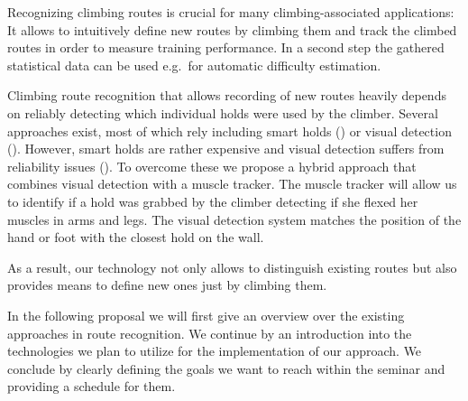 Recognizing climbing routes is crucial for many climbing-associated applications:
It allows to intuitively define new routes by climbing them and track the climbed routes in order to measure training performance.
In a second step the gathered statistical data can be used e.g.\ for automatic difficulty estimation.

Climbing route recognition that allows recording of new routes heavily depends on reliably detecting which individual holds were used by the climber.
Several approaches exist, most of which rely including smart holds () or visual detection ().
However, smart holds are rather expensive and visual detection suffers from reliability issues ().
To overcome these we propose a hybrid approach that combines visual detection with a muscle tracker.
The muscle tracker will allow us to identify if a hold was grabbed by the climber detecting if she flexed her muscles in arms and legs.
The visual detection system matches the position of the hand or foot with the closest hold on the wall.

As a result, our technology not only allows to distinguish existing routes but also provides means to define new ones just by climbing them.

In the following proposal we will first give an overview over the existing approaches in route recognition.
We continue by an introduction into the technologies we plan to utilize for the implementation of our approach.
We conclude by clearly defining the goals we want to reach within the seminar and providing a schedule for them.

